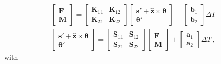 \documentclass[letterpaper,10pt,english]{jupyterBook}
\begin{document}
\begin{equation*}
\begin{split}\begin{bmatrix} \mathbf{F} \\ \mathbf{M} \end{bmatrix} = \begin{bmatrix} \mathbf{K}_{11} & \mathbf{K}_{12} \\ \mathbf{K}_{21} & \mathbf{K}_{22}  \end{bmatrix} \begin{bmatrix} \mathbf{s}'+\hat{\mathbf{z}} \times \boldsymbol\theta \\ \boldsymbol\theta' \end{bmatrix} - \begin{bmatrix} \mathbf{b}_1 \\ \mathbf{b}_2 \end{bmatrix} \Delta T\end{split}
\end{equation*}\begin{equation*}
\begin{split}\begin{bmatrix} \mathbf{s}'+\hat{\mathbf{z}} \times \boldsymbol\theta \\ \boldsymbol\theta' \end{bmatrix} = \begin{bmatrix} \mathbf{S}_{11} & \mathbf{S}_{12} \\ \mathbf{S}_{21} & \mathbf{S}_{22} \end{bmatrix} \begin{bmatrix} \mathbf{F} \\ \mathbf{M} \end{bmatrix} + \begin{bmatrix} \mathbf{a}_1 \\ \mathbf{a}_2 \end{bmatrix} \Delta T \ ,\end{split}
\end{equation*}
\sphinxAtStartPar
with
\end{document}
